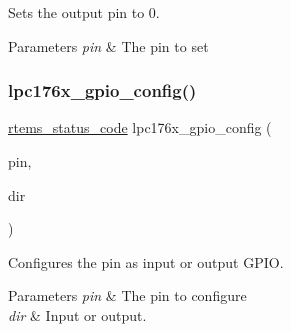 Sets the output pin to 0. 


\begin{DoxyParams}{Parameters}
{\em pin} & The pin to set \\
\hline
\end{DoxyParams}
\mbox{\label{lpc-gpio_8h_a9565e4ec4013f20eadb825db494a612e}} 
\subsubsection{\texorpdfstring{lpc176x\_gpio\_config()}{lpc176x\_gpio\_config()}}
{\footnotesize\ttfamily \mbox{\hyperlink{group__ClassicStatus_ga545d41846817eaba6143d52ee4d9e9fe}{rtems\+\_\+status\+\_\+code}} lpc176x\+\_\+gpio\+\_\+config (\begin{DoxyParamCaption}\item[{\mbox{\hyperlink{common-types_8h_a8215ced1557c43bc5925b691a3c1dc23}{lpc176x\+\_\+pin\+\_\+number}}}]{pin,  }\item[{\mbox{\hyperlink{gpio-defs_8h_a0c9e959ab33ca3965f03caf07c8ecc17}{lpc176x\+\_\+gpio\+\_\+direction}}}]{dir }\end{DoxyParamCaption})}



Configures the pin as input or output G\+P\+IO. 


\begin{DoxyParams}{Parameters}
{\em pin} & The pin to configure \\
\hline
{\em dir} & Input or output. \\
\hline
\end{DoxyParams}
\mbox{\label{lpc-gpio_8h_a87097ba2ad9bf2907e08ff92a69d47c1}} 
